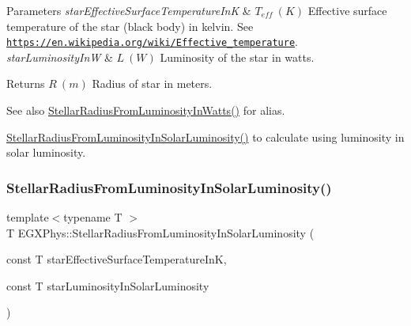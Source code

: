 \begin{DoxyParams}{Parameters}
{\em star\+Effective\+Surface\+Temperature\+InK} & $T_{eff}\ (K)$ Effective surface temperature of the star (black body) in kelvin. See \href{https://en.wikipedia.org/wiki/Effective_temperature}{\tt https\+://en.\+wikipedia.\+org/wiki/\+Effective\+\_\+temperature}. \\
\hline
{\em star\+Luminosity\+InW} & $L\ (W)$ Luminosity of the star in watts. \\
\hline
\end{DoxyParams}
\begin{DoxyReturn}{Returns}
$R\ (m)$ Radius of star in meters. 
\end{DoxyReturn}
\begin{DoxySeeAlso}{See also}
\mbox{\hyperlink{group___e_g_x_phys-_stellar_radius_ga59f0d5d89a857d30bff4c93713ee5bd9}{Stellar\+Radius\+From\+Luminosity\+In\+Watts()}} for alias. 

\mbox{\hyperlink{group___e_g_x_phys-_stellar_radius_ga49f0848777ba12cdfc78d112d82036ce}{Stellar\+Radius\+From\+Luminosity\+In\+Solar\+Luminosity()}} to calculate using luminosity in solar luminosity. 
\end{DoxySeeAlso}
\mbox{\label{group___e_g_x_phys-_stellar_radius_ga49f0848777ba12cdfc78d112d82036ce}} 
\subsubsection{\texorpdfstring{Stellar\+Radius\+From\+Luminosity\+In\+Solar\+Luminosity()}{StellarRadiusFromLuminosityInSolarLuminosity()}}
{\footnotesize\ttfamily template$<$typename T $>$ \\
T E\+G\+X\+Phys\+::\+Stellar\+Radius\+From\+Luminosity\+In\+Solar\+Luminosity (\begin{DoxyParamCaption}\item[{const T}]{star\+Effective\+Surface\+Temperature\+InK,  }\item[{const T}]{star\+Luminosity\+In\+Solar\+Luminosity }\end{DoxyParamCaption})}



